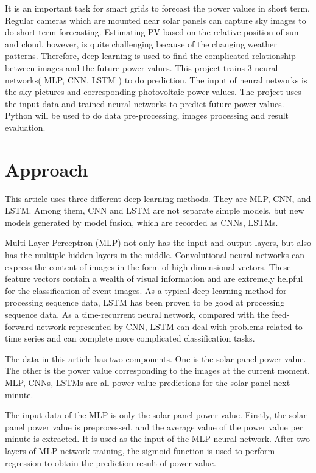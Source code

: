 It is an important task for smart grids to forecast the power values in short term. Regular cameras which are mounted near solar panels can capture sky images to do short-term forecasting.\cite{yang2014solar} Estimating PV  based on the  relative position of sun and cloud, however, is quite challenging because of the changing weather patterns.\cite{huld2012new} 
Therefore, deep learning is used to find the complicated relationship between  images and the future  power values. This project trains 3  neural networks( MLP, CNN, LSTM ) to do prediction. The input of neural networks is the sky pictures and corresponding photovoltaic power values. The project uses the input data and   trained neural networks to predict future  power values. Python will be used to do data pre-processing,  images processing and result evaluation.



\section{Approach}
This article uses three different deep learning methods. They are MLP, CNN, and LSTM. Among them, CNN and LSTM are not separate simple models, but new models generated by model fusion, which are recorded as CNNs, LSTMs. 

Multi-Layer Perceptron (MLP) not only has the input and output layers, but also has the multiple hidden layers in the middle. Convolutional neural networks can express the content of images in the form of high-dimensional vectors. These feature vectors contain a wealth of visual information and are extremely helpful for the classification of event images. 
As a typical deep learning method for processing sequence data, LSTM has been proven to be good at processing sequence data. 
As a time-recurrent neural network, compared with the feed-forward network represented by CNN, LSTM can deal with problems related to time series and can complete more complicated classification tasks. 

The data in this article has two components. One is the solar panel power value. The other is the power value corresponding to the images at the current moment. MLP, CNNs, LSTMs are all power value predictions for the solar panel next minute.

The input data of the MLP is only the solar panel power value. Firstly, the solar panel power value is preprocessed, and the average value of the power value per minute is extracted. 
It is used as the input of the MLP neural network. After two layers of MLP network training, the sigmoid function is used to perform regression to obtain the prediction result of power value.

